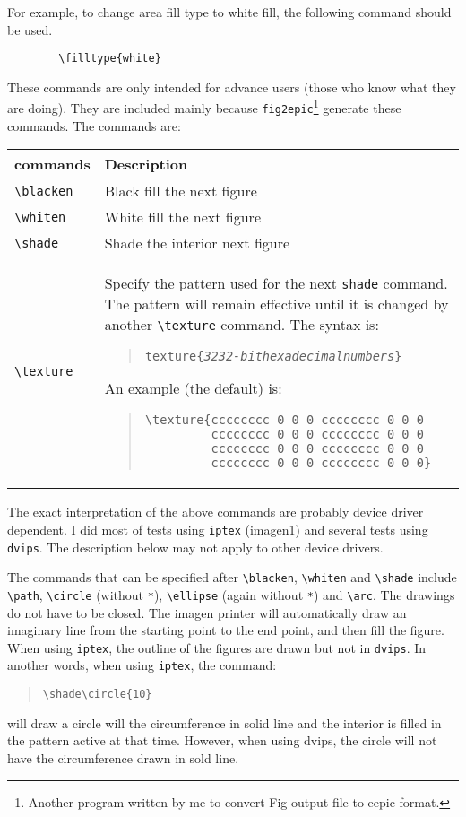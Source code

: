 For example, to change area fill type to white fill, the
following command should be used.
\begin{verbatim}
        \filltype{white}
\end{verbatim}


These commands are only intended for advance users (those who
know what they are doing). They are included mainly because
\verb|fig2epic|\footnote{Another program written by me to convert
Fig output file to eepic format.} generate these commands. The
commands are:
\begin{center}
\begin{tabular}{|l|p{4.4in}|}\hline
\multicolumn{1}{|c|}{commands} & \qquad Description \\ \hline
\verb|\blacken| & Black fill the next figure \\
\verb|\whiten| & White fill the next figure \\
\verb|\shade| & Shade the interior next figure \\
\verb|\texture| & Specify the pattern used for the next
\verb|shade| command. The pattern will remain effective until it is
changed by another \verb|\texture| command.
The syntax is:
\begin{quote}
\begin{alltt}
\BS{}texture\{{\em 32 32-bit hexadecimal numbers}\}
\end{alltt}
\end{quote}
An example (the default) is:
\begin{quote}
\begin{verbatim}
\texture{cccccccc 0 0 0 cccccccc 0 0 0 
         cccccccc 0 0 0 cccccccc 0 0 0 
         cccccccc 0 0 0 cccccccc 0 0 0 
         cccccccc 0 0 0 cccccccc 0 0 0}
\end{verbatim} 
\end{quote} \\
\hline
\end{tabular}
\end{center}
The exact interpretation of the above commands are probably
device driver dependent. I did most of tests using \verb|iptex|
(imagen1) and several tests using \verb|dvips|. 
The description below may not apply to other
device drivers.

The commands that can be specified after \verb|\blacken|,
\verb|\whiten| and \verb|\shade| include \verb|\path|,
\verb|\circle| (without \verb|*|), \verb|\ellipse| (again without
\verb|*|) and \verb|\arc|. The drawings do not have to be closed.
The imagen printer will automatically draw an imaginary line from
the starting point to the end point, and then fill the figure.
When using \verb|iptex|, the outline of the figures are drawn but not
in \verb|dvips|. In another words, when using \verb|iptex|, the command:
\begin{quote}
\begin{verbatim}
\shade\circle{10}
\end{verbatim}
\end{quote}
will draw a circle will the circumference in solid line and the
interior is filled in the pattern active at that time. However, when using
dvips, the circle will not have the circumference drawn in sold line.

